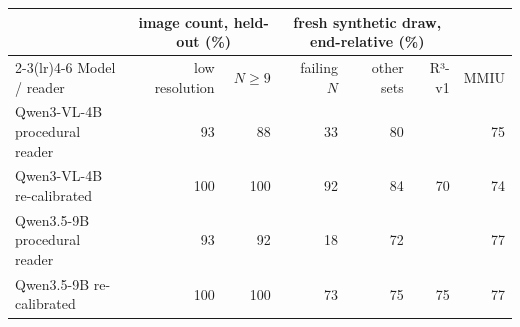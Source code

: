 \begin{tabular}{lrrrrrr}
\toprule
& \multicolumn{2}{c}{image count, held-out (\%)} & \multicolumn{3}{c}{fresh synthetic draw, end-relative (\%)} & \\
\cmidrule(lr){2-3}\cmidrule(lr){4-6}
Model / reader & low resolution & $N\geq9$ & failing $N$ & other sets & R³-v1 & MMIU \\
\midrule
Qwen3-VL-4B procedural reader & 93 & 88 & 33 & 80 &  & 75 \\
Qwen3-VL-4B re-calibrated & 100 & 100 & 92 & 84 & 70 & 74 \\
Qwen3.5-9B procedural reader & 93 & 92 & 18 & 72 &  & 77 \\
Qwen3.5-9B re-calibrated & 100 & 100 & 73 & 75 & 75 & 77 \\
\bottomrule
\end{tabular}
